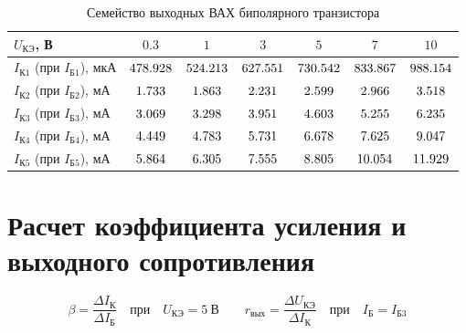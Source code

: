 \documentclass[12pt,a4paper]{article}
\def\IkOneUoThree{\fpeval{478.928 * 10^{-6}}} %
\def\IkOneUone   {\fpeval{524.213 * 10^{-6}}} %
\def\IkOneUthree {\fpeval{627.551 * 10^{-6}}} %
\def\IkOneUfive  {\fpeval{730.542 * 10^{-6}}} %
\def\IkOneUseven {\fpeval{833.867 * 10^{-6}}} %
\def\IkOneUten   {\fpeval{988.154 * 10^{-6}}} %
\def\IkTwoUoThree{\fpeval{1.733 * 10^{-3}}} %
\def\IkTwoUone   {\fpeval{1.863 * 10^{-3}}} %
\def\IkTwoUthree {\fpeval{2.231 * 10^{-3}}} %
\def\IkTwoUfive  {\fpeval{2.599 * 10^{-3}}} %
\def\IkTwoUseven {\fpeval{2.966 * 10^{-3}}} %
\def\IkTwoUten   {\fpeval{3.518 * 10^{-3}}} %
\def\IkThreeUoThree{\fpeval{3.069 * 10^{-3}}} %
\def\IkThreeUone   {\fpeval{3.298 * 10^{-3}}} %
\def\IkThreeUthree {\fpeval{3.951 * 10^{-3}}} %
\def\IkThreeUfive  {\fpeval{4.603 * 10^{-3}}} %
\def\IkThreeUseven {\fpeval{5.255 * 10^{-3}}} %
\def\IkThreeUten   {\fpeval{6.235 * 10^{-3}}} %
\def\IkFourUoThree{\fpeval{4.449 * 10^{-3}}} %
\def\IkFourUone   {\fpeval{4.783 * 10^{-3}}} %
\def\IkFourUthree {\fpeval{5.731 * 10^{-3}}} %
\def\IkFourUfive  {\fpeval{6.678 * 10^{-3}}} %
\def\IkFourUseven {\fpeval{7.625 * 10^{-3}}} %
\def\IkFourUten   {\fpeval{9.047 * 10^{-3}}} %
\def\IkFiveUoThree{\fpeval{5.864 * 10^{-3}}} %
\def\IkFiveUone   {\fpeval{6.305 * 10^{-3}}} %
\def\IkFiveUthree {\fpeval{7.555 * 10^{-3}}} %
\def\IkFiveUfive  {\fpeval{8.805 * 10^{-3}}} %
\def\IkFiveUseven {\fpeval{10.054 * 10^{-3}}} %
\def\IkFiveUten   {\fpeval{11.929 * 10^{-3}}} %
\begin{document}
\begin{table}[H]
\centering
\small
\begin{tabularx}{\textwidth}{|p{3cm}|C|C|C|C|C|C|}
	\hline
	$U_\text{КЭ}$, В & $0.3$ & $1$ & $3$ & $5$ & $7$ & $10$ \\
	\hline
	$I_\text{К1}$ (при $I_\text{Б1}$), мкА & $\fpeval{\IkOneUoThree * 10^{6}}$ & $\fpeval{\IkOneUone * 10^{6}}$ & $\fpeval{\IkOneUthree * 10^{6}}$ & $\fpeval{\IkOneUfive * 10^{6}}$ & $\fpeval{\IkOneUseven * 10^{6}}$ & $\fpeval{\IkOneUten * 10^{6}}$ \\
	\hline
	$I_\text{К2}$ (при $I_\text{Б2}$), мА & $\fpeval{\IkTwoUoThree * 10^{3}}$ & $\fpeval{\IkTwoUone * 10^{3}}$ & $\fpeval{\IkTwoUthree * 10^{3}}$ & $\fpeval{\IkTwoUfive * 10^{3}}$ & $\fpeval{\IkTwoUseven * 10^{3}}$ & $\fpeval{\IkTwoUten * 10^{3}}$ \\
	\hline
	$I_\text{К3}$ (при $I_\text{Б3}$), мА & $\fpeval{\IkThreeUoThree * 10^{3}}$ & $\fpeval{\IkThreeUone * 10^{3}}$ & $\fpeval{\IkThreeUthree * 10^{3}}$ & $\fpeval{\IkThreeUfive * 10^{3}}$ & $\fpeval{\IkThreeUseven * 10^{3}}$ & $\fpeval{\IkThreeUten * 10^{3}}$ \\
	\hline
	$I_\text{К4}$ (при $I_\text{Б4}$), мА & $\fpeval{\IkFourUoThree * 10^{3}}$ & $\fpeval{\IkFourUone * 10^{3}}$ & $\fpeval{\IkFourUthree * 10^{3}}$ & $\fpeval{\IkFourUfive * 10^{3}}$ & $\fpeval{\IkFourUseven * 10^{3}}$ & $\fpeval{\IkFourUten * 10^{3}}$ \\
	\hline
	$I_\text{К5}$ (при $I_\text{Б5}$), мА & $\fpeval{\IkFiveUoThree * 10^{3}}$ & $\fpeval{\IkFiveUone * 10^{3}}$ & $\fpeval{\IkFiveUthree * 10^{3}}$ & $\fpeval{\IkFiveUfive * 10^{3}}$ & $\fpeval{\IkFiveUseven * 10^{3}}$ & $\fpeval{\IkFiveUten * 10^{3}}$ \\
	\hline
\end{tabularx}
\caption{Семейство выходных ВАХ биполярного транзистора}
\end{table}

\section{Расчет коэффициента усиления и выходного сопротивления}
\begin{equation*}
\beta = \frac{\Delta I_\text{К}}{\Delta I_\text{Б}} \quad \text{при} \quad U_\text{КЭ}=5~\text{В} 
\qquad 
r_\text{вых} = \frac{\Delta U_\text{КЭ}}{\Delta I_\text{К}} \quad \text{при} \quad I_\text{Б}=I_\text{Б3}
\end{equation*}
\end{document}
